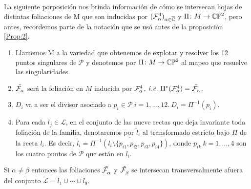 
La siguiente porposición nos brinda información de cómo se intersecan hojas de distintas foliaciones de M que son inducidas por $(\Fol[4]{\alpha})_{\alpha\in\overline\C}$ y $\Pi\colon M\rightarrow\CP$, pero antes, recordemos parte de la notación que se usó antes de la proposición \ref{Prop:2}.

\begin{enumerate}


\item Llamemos M a la variedad que obtenemos de explotar y resolver los 12 puntos singulares de $\mathcal{P}$ y denotemos por $\Pi\colon M \rightarrow \CP$ al mapeo que resuelve las singularidades.

\item $\tilde{\Fol{\alpha}}$ será la foliación en $M$ inducida por $\Fol[4]{\alpha}$,  $\mathit{i.e.} \ \Pi^{*}(\Fol[4]{\alpha}) = \tilde{\Fol{\alpha}}$.

\item $D_{i}$ va a ser el divisor asociado a $p_{i} \in \mathcal{P} \ i=1,...,12. \ D_{i} = \Pi^{-1}(p_{i})$.

\item Para cada $l_{j} \in \mathcal{L}$, en el conjunto de las nueve rectas que deja invariante toda foliación de la familia,  denotaremos por $\tilde{l}_{i}$ al transformado estricto bajo $\Pi$ de la recta $l_{i}$. Es decir, $\tilde{l}_{i}= \overline{\Pi^{-1}(l_{i} \setminus \{p_{i1}, p_{i2}, p_{i3}, p_{i4} \})}$, donde $p_{ik} \ k=1,...,4$ son los cuatro puntos de $\mathcal{P}$ que están en $l_{i}$.

\end{enumerate}


\begin{Proposicion}
\label{Prop:Transversalidad}
Si $\alpha\neq\beta$ entonces las foliaciones $\tilde{\Fol{\alpha}}$ y $\tilde{\Fol{\beta}}$ se intersecan transversalmente afuera del conjunto $\tilde{\mathcal{L}} = \tilde{l}_{1}\cup\cdots\cup\tilde{l}_{9}$.
\end{Proposicion}

